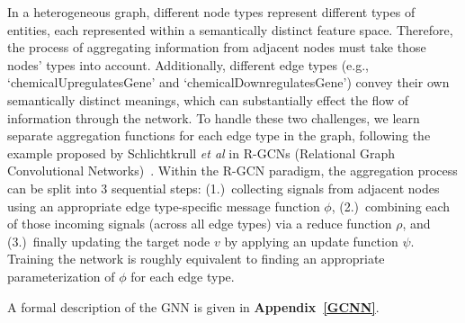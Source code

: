 \documentclass{ws-procs11x85}
\begin{document}
In a heterogeneous graph, different node types represent different types of entities, each represented within a semantically distinct feature space.
Therefore, the process of aggregating information from adjacent nodes must take those nodes' types into account.
Additionally, different edge types (e.g., `chemicalUpregulatesGene' and `chemicalDownregulatesGene') convey their own semantically distinct meanings, which can substantially effect the flow of information through the network.
To handle these two challenges, we learn separate aggregation functions for each edge type in the graph, following the example proposed by Schlichtkrull \textit{et al} in R-GCNs (Relational Graph Convolutional Networks)~\cite{schlichtkrull2018modeling}.
Within the R-GCN paradigm, the aggregation process can be split into 3 sequential steps: (1.)~collecting signals from adjacent nodes using an appropriate edge type-specific message function $\phi$, (2.)~combining each of those incoming signals (across all edge types) via a reduce function $\rho$, and (3.)~finally updating the target node $v$ by applying an update function $\psi$.
Training the network is roughly equivalent to finding an appropriate parameterization of $\phi$ for each edge type.

A formal description of the GNN is given in \textbf{Appendix~\ref{GCNN}}.

\end{document}
